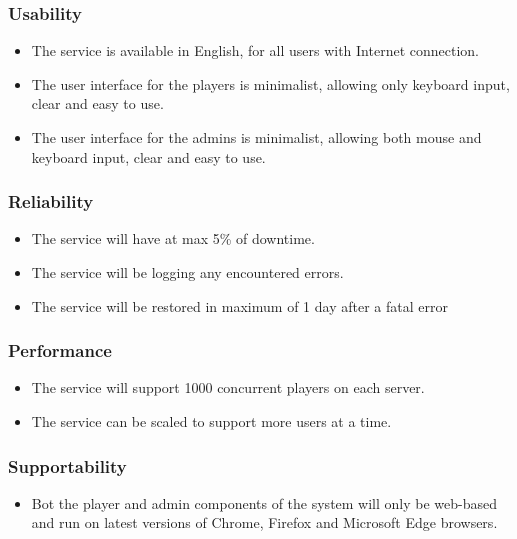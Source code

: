\documentclass{article}
\begin{document}
\subsubsection{Usability}

\begin{itemize}
	\item The service is available in English, for all users with Internet connection.
	\item The user interface for the players is minimalist, allowing only keyboard input, clear and easy to use.
	\item The user interface for the admins is minimalist, allowing both mouse and keyboard input, clear and easy to use.
\end{itemize}

\subsubsection{Reliability}

\begin{itemize}
	\item The service will have at max 5\% of downtime.
	\item The service will be logging any encountered errors.
	\item The service will be restored in maximum of 1 day after a fatal error
\end{itemize}

\subsubsection{Performance}

\begin{itemize}
	\item The service will support 1000 concurrent players on each server.
	\item The service can be scaled to support more users at a time.
\end{itemize}

\subsubsection{Supportability}

\begin{itemize}
	\item Bot the player and admin components of the system will only be web-based and run on latest versions of Chrome, Firefox and Microsoft Edge browsers.
\end{itemize}
\end{document}
